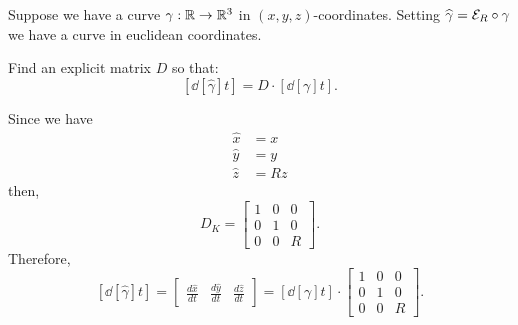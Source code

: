 \documentclass[newpage,hints,handout,12pt,noauthor,nooutcomes]{ximera}
\begin{document}
\begin{problem}
  Suppose we have a curve $\gamma:\mathbb R\to\mathbb R^3$ in
  $(x,y,z)$-coordinates. Setting $\widehat \gamma = \mathcal{E}_R\circ\gamma$ we have
  a curve in euclidean coordinates. 
  \begin{center}
  \end{center}
  Find an explicit matrix $D$ so that:
  \[
  \left[\dd[\hat{\gamma}]{t}\right] = D \cdot \left[ \dd[\gamma]{t}\right].
  \]
  
\begin{freeResponse}
Since we have 
\begin{align*}
\hat{x}  &  =x\\
\hat{y}  &  =y\\
\hat{z}  &  =Rz
\end{align*}
then, 
\[
D_K = 
 \begin{bmatrix}
    1 & 0 & 0\\
    0 & 1 & 0\\
    0 & 0 & R
  \end{bmatrix}.
  \]
  Therefore, 
  \[
 \left[\dd[\hat{\gamma}]{t}\right] 
= \begin{bmatrix}
\frac{d\hat{x}}{dt} & \frac{d\hat{y}}{dt} & \frac{d\hat{z}}{dt}%
\end{bmatrix}
= \left[ \dd[\gamma]{t}\right] \cdot
  \begin{bmatrix}
    1 & 0 & 0\\
    0 & 1 & 0\\
    0 & 0 & R
  \end{bmatrix}.
\]
\end{freeResponse}

\end{problem}
\end{document}
